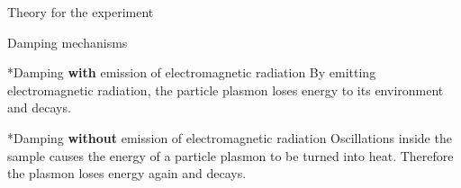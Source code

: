 \documentclass[pdftex, a4paper,11pt, twoside, UKenglish]{report}
\begin{document}
\begin{chapter}{Theory for the experiment}
\begin{section}{Damping mechanisms}
      \begin{subsection}*{Damping \textbf{with} emission of electromagnetic
        radiation}
        By emitting electromagnetic radiation, the particle plasmon loses
        energy to its environment and decays.
      \end{subsection}
      
      \begin{subsection}*{Damping \textbf{without} emission of electromagnetic
        radiation}
        Oscillations inside the sample causes the energy of a particle plasmon
        to be turned into heat. Therefore the plasmon loses energy again and
        decays.
      \end{subsection}
    \end{section}
    
    
    

\end{chapter}
\end{document}
